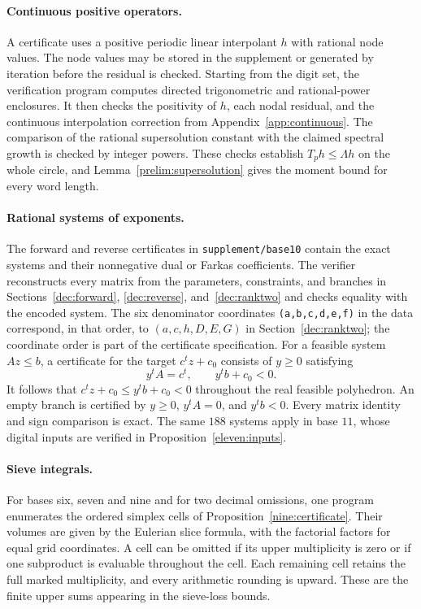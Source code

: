 \documentclass[11pt,a4paper]{article}
\theoremstyle{paperplain}
\numberwithin{equation}{section}
\begin{document}
\paragraph{Continuous positive operators.}
A certificate uses a positive periodic linear interpolant \(h\)
with rational node values. The node values may be stored in the
supplement or generated by iteration before the residual is checked.
Starting from the digit set, the verification program computes directed
trigonometric and rational-power enclosures. It then checks the positivity
of $h$, each nodal residual, and the continuous interpolation correction
from Appendix~\ref{app:continuous}. The comparison of the rational
supersolution constant with the claimed spectral growth is checked by
integer powers. These checks establish $T_ph\leqslant\Lambda h$
on the whole circle, and Lemma~\ref{prelim:supersolution} gives the
moment bound for every word length.

\paragraph{Rational systems of exponents.}
The forward and reverse certificates in \texttt{supplement/base10}
contain the exact systems and
their nonnegative dual or Farkas coefficients.
The verifier reconstructs every matrix from the parameters, constraints,
and branches in Sections~\ref{dec:forward}, \ref{dec:reverse},
and~\ref{dec:ranktwo} and checks
equality with the encoded system.
The six denominator coordinates \texttt{(a,b,c,d,e,f)} in the data
correspond, in that order, to $(a,c,h,D,E,G)$ in
Section~\ref{dec:ranktwo}; the coordinate order is part of the
certificate specification.
For a feasible system $Az\leqslant b$, a certificate for the target
$c^tz+c_0$ consists of $y\geqslant0$ satisfying
\[
 y^tA=c^t,\qquad y^tb+c_0<0.
\]
It follows that $c^tz+c_0\leqslant y^tb+c_0<0$ throughout the
real feasible polyhedron. An empty branch is certified by
$y\geqslant0$, $y^tA=0$, and $y^tb<0$.
Every matrix identity and sign comparison is exact.
The same $188$ systems apply in base $11$, whose digital inputs are
verified in Proposition~\ref{eleven:inputs}.

\paragraph{Sieve integrals.}
For bases six, seven and nine and for two decimal omissions, one
program enumerates the ordered simplex cells of
Proposition~\ref{nine:certificate}. Their volumes are given by the
Eulerian slice formula, with the factorial factors for equal grid
coordinates. A cell can be omitted if its upper multiplicity is zero
or if one subproduct is evaluable throughout the cell. Each remaining
cell retains the full marked
multiplicity, and every arithmetic rounding is upward.
These are the finite upper sums appearing in the sieve-loss bounds.
\end{document}
